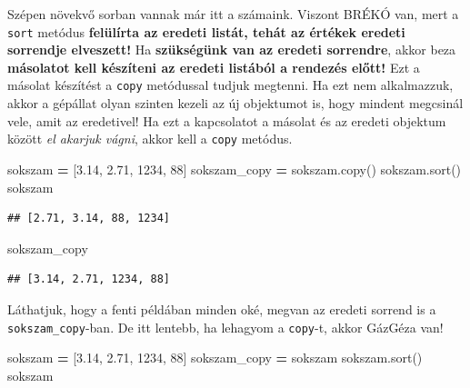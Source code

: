 \documentclass[
]{book}
\newenvironment{Shaded}{\begin{snugshade}}{\end{snugshade}}
\newcommand{\DecValTok}[1]{\textcolor[rgb]{0.00,0.00,0.81}{#1}}
\newcommand{\FloatTok}[1]{\textcolor[rgb]{0.00,0.00,0.81}{#1}}
\newcommand{\NormalTok}[1]{#1}
\newcommand{\OperatorTok}[1]{\textcolor[rgb]{0.81,0.36,0.00}{\textbf{#1}}}
\begin{document}
Szépen növekvő sorban vannak már itt a számaink. Viszont BRÉKÓ van, mert a \texttt{sort} metódus \textbf{felülírta az eredeti listát, tehát az értékek eredeti sorrendje elveszett!} Ha \textbf{szükségünk van az eredeti sorrendre}, akkor beza \textbf{másolatot kell készíteni az eredeti listából a rendezés előtt!} Ezt a másolat készítést a \texttt{copy} metódussal tudjuk megtenni. Ha ezt nem alkalmazzuk, akkor a gépállat olyan szinten kezeli az új objektumot is, hogy mindent megcsinál vele, amit az eredetivel! Ha ezt a kapcsolatot a másolat és az eredeti objektum között \emph{el akarjuk vágni}, akkor kell a \texttt{copy} metódus.

\begin{Shaded}
\begin{Highlighting}[]
\NormalTok{sokszam }\OperatorTok{=}\NormalTok{ [}\FloatTok{3.14}\NormalTok{, }\FloatTok{2.71}\NormalTok{, }\DecValTok{1234}\NormalTok{, }\DecValTok{88}\NormalTok{]}
\NormalTok{sokszam\_copy }\OperatorTok{=}\NormalTok{ sokszam.copy()}
\NormalTok{sokszam.sort()}
\NormalTok{sokszam}
\end{Highlighting}
\end{Shaded}

\begin{verbatim}
## [2.71, 3.14, 88, 1234]
\end{verbatim}

\begin{Shaded}
\begin{Highlighting}[]
\NormalTok{sokszam\_copy}
\end{Highlighting}
\end{Shaded}

\begin{verbatim}
## [3.14, 2.71, 1234, 88]
\end{verbatim}

Láthatjuk, hogy a fenti példában minden oké, megvan az eredeti sorrend is a \texttt{sokszam\_copy}-ban. De itt lentebb, ha lehagyom a \texttt{copy}-t, akkor GázGéza van!

\begin{Shaded}
\begin{Highlighting}[]
\NormalTok{sokszam }\OperatorTok{=}\NormalTok{ [}\FloatTok{3.14}\NormalTok{, }\FloatTok{2.71}\NormalTok{, }\DecValTok{1234}\NormalTok{, }\DecValTok{88}\NormalTok{]}
\NormalTok{sokszam\_copy }\OperatorTok{=}\NormalTok{ sokszam}
\NormalTok{sokszam.sort()}
\NormalTok{sokszam}
\end{Highlighting}
\end{Shaded}
\end{document}
